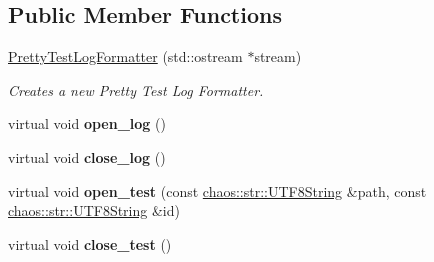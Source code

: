 \subsection*{Public Member Functions}
\begin{DoxyCompactItemize}
\item 
\hypertarget{classchaos_1_1test_1_1log__formatter_1_1_pretty_test_log_formatter_ad537150be7fb4514fb9b47aba18ea73f}{}\hyperlink{classchaos_1_1test_1_1log__formatter_1_1_pretty_test_log_formatter_ad537150be7fb4514fb9b47aba18ea73f}{Pretty\+Test\+Log\+Formatter} (std\+::ostream $\ast$stream)\label{classchaos_1_1test_1_1log__formatter_1_1_pretty_test_log_formatter_ad537150be7fb4514fb9b47aba18ea73f}

\begin{DoxyCompactList}\small\item\em Creates a new Pretty Test Log Formatter. \end{DoxyCompactList}\item 
\hypertarget{classchaos_1_1test_1_1log__formatter_1_1_pretty_test_log_formatter_acfc156f1c2b4c0b688573f648c6b7349}{}virtual void {\bfseries open\+\_\+log} ()\label{classchaos_1_1test_1_1log__formatter_1_1_pretty_test_log_formatter_acfc156f1c2b4c0b688573f648c6b7349}

\item 
\hypertarget{classchaos_1_1test_1_1log__formatter_1_1_pretty_test_log_formatter_a55167e42a2e956fc520ab7671945bf36}{}virtual void {\bfseries close\+\_\+log} ()\label{classchaos_1_1test_1_1log__formatter_1_1_pretty_test_log_formatter_a55167e42a2e956fc520ab7671945bf36}

\item 
\hypertarget{classchaos_1_1test_1_1log__formatter_1_1_pretty_test_log_formatter_ae77aea3084d292464322207573b18a53}{}virtual void {\bfseries open\+\_\+test} (const \hyperlink{classchaos_1_1str_1_1_u_t_f8_string}{chaos\+::str\+::\+U\+T\+F8\+String} \&path, const \hyperlink{classchaos_1_1str_1_1_u_t_f8_string}{chaos\+::str\+::\+U\+T\+F8\+String} \&id)\label{classchaos_1_1test_1_1log__formatter_1_1_pretty_test_log_formatter_ae77aea3084d292464322207573b18a53}

\item 
\hypertarget{classchaos_1_1test_1_1log__formatter_1_1_pretty_test_log_formatter_a02d6208a064405bcd183661755eb2289}{}virtual void {\bfseries close\+\_\+test} ()\label{classchaos_1_1test_1_1log__formatter_1_1_pretty_test_log_formatter_a02d6208a064405bcd183661755eb2289}

\end{DoxyCompactItemize}
